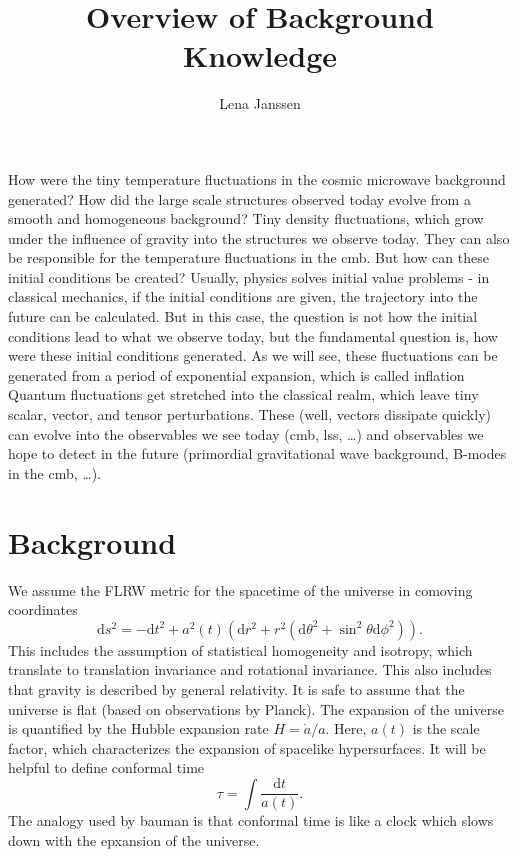 \documentclass[12pt]{article}
\title{Overview of Background Knowledge}
\author{Lena Janssen}
\date{}
\begin{document}
\maketitle

\hypersetup{linkcolor=black}
\tableofcontents

How were the tiny temperature fluctuations in the cosmic microwave background generated? How did the large scale structures observed today evolve from a smooth and homogeneous background? Tiny density fluctuations, which grow under the influence of gravity into the structures we observe today. They can also be responsible for the temperature fluctuations in the cmb. But how can these initial conditions be created? Usually, physics solves initial value problems - in classical mechanics, if the initial conditions are given, the trajectory into the future can be calculated. But in this case, the question is not how the initial conditions lead to what we observe today, but the fundamental question is, how were these initial conditions generated. As we will see, these fluctuations can be generated from a period of exponential expansion, which is called inflation Quantum fluctuations get stretched into the classical realm, which leave tiny scalar, vector, and tensor perturbations. These (well, vectors dissipate quickly) can evolve into the observables we see today (cmb, lss, \dots) and observables we hope to detect in the future (primordial gravitational wave background, B-modes in the cmb, \dots). 

\section{Background}
We assume the FLRW metric for the spacetime of the universe in comoving coordinates
\begin{equation}
    \mathrm{d}s^2 = -\mathrm{d}t^2 + a^2(t)\left(\mathrm{d}r^2 + r^2(\mathrm{d}\theta^2 + \sin^2\theta \mathrm{d}\phi^2)\right).
\end{equation}
This includes the assumption of statistical homogeneity and isotropy, which translate to translation invariance and rotational invariance. This also includes that gravity is described by general relativity. It is safe to assume that the universe is flat (based on observations by Planck). The expansion of the universe is quantified by the Hubble expansion rate $H= \dot{a}/a$. Here, $a(t)$ is the scale factor, which characterizes the expansion of spacelike hypersurfaces. It will be helpful to define conformal time
\begin{equation}
    \tau = \int \frac{\mathrm{d}t}{a(t)}.
\end{equation}
The analogy used by bauman is that conformal time is like a clock which slows down with the epxansion of the universe. 
\end{document}
